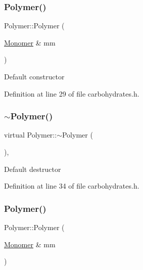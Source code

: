 \subsubsection{\texorpdfstring{Polymer()}{Polymer()}\hspace{0.1cm}{\footnotesize\ttfamily [1/14]}}
{\footnotesize\ttfamily Polymer\+::\+Polymer (\begin{DoxyParamCaption}\item[{\hyperlink{class_monomer}{Monomer} \&}]{mm }\end{DoxyParamCaption})\hspace{0.3cm}{\ttfamily [inline]}}

Default constructor 

Definition at line 29 of file carbohydrates.\+h.

\mbox{\label{class_polymer_aac2b3983f375a5691c7d5ca1a79594d5}} 
\subsubsection{\texorpdfstring{$\sim$\+Polymer()}{~Polymer()}\hspace{0.1cm}{\footnotesize\ttfamily [1/11]}}
{\footnotesize\ttfamily virtual Polymer\+::$\sim$\+Polymer (\begin{DoxyParamCaption}{ }\end{DoxyParamCaption})\hspace{0.3cm}{\ttfamily [inline]}, {\ttfamily [virtual]}}

Default destructor 

Definition at line 34 of file carbohydrates.\+h.

\mbox{\label{class_polymer_ae77454a3908652e4df6a26b9cac509a5}} 
\subsubsection{\texorpdfstring{Polymer()}{Polymer()}\hspace{0.1cm}{\footnotesize\ttfamily [2/14]}}
{\footnotesize\ttfamily Polymer\+::\+Polymer (\begin{DoxyParamCaption}\item[{\hyperlink{class_monomer}{Monomer} \&}]{mm }\end{DoxyParamCaption})\hspace{0.3cm}{\ttfamily [inline]}}

